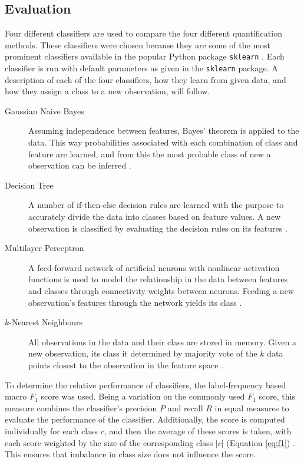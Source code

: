 \documentclass[conference,a4paper,twoside]{IEEEtran}
\begin{document}
\subsection{Evaluation}
\label{sec:methods_compare}
Four different classifiers are used to compare the four different quantification methods. These classifiers were chosen because they are some of the most prominent classifiers available in the popular Python package \lstinline{sklearn} \cite{scikit-learn}. Each classifier is run with default parameters as given in the \lstinline{sklearn} package. A description of each of the four classifiers, how they learn from given data, and how they assign a class to a new observation, will follow.

\begin{description}
    \item[Gaussian Naive Bayes] Assuming independence between features, Bayes' theorem is applied to the data. This way probabilities associated with each combination of class and feature are learned, and from this the most probable class of new a observation can be inferred \cite{murphy2006naive}.
    \item[Decision Tree] A number of if-then-else decision rules are learned with the purpose to accurately divide the data into classes based on feature values. A new observation is classified by evaluating the decision rules on its features \cite{safavian1991survey}.
    \item[Multilayer Perceptron] A feed-forward network of artificial neurons with nonlinear activation functions is used to model the relationship in the data between features and classes through connectivity weights between neurons. Feeding a new observation's features through the network yields its class \cite{gardner1998artificial}.
    \item[$k$-Nearest Neighbours] All observations in the data and their class are stored in memory. Given a new observation, its class it determined by majority vote of the $k$ data points closest to the observation in the feature space \cite{altman1992introduction}.
\end{description}


To determine the relative performance of classifiers, the label-frequency based macro $F_1$ score was used. Being a variation on the commonly used $F_1$ score, this measure combines the classifier's precision $P$ and recall $R$ in equal measures to evaluate the performance of the classifier. Additionally, the score is computed individually for each class $c$, and then the average of these scores is taken, with each score weighted by the size of the corresponding class $|c|$ (Equation \ref{eq:f1}) \cite{van2013macro}. This ensures that imbalance in class size does not influence the score.
\end{document}
